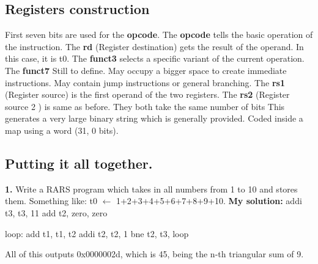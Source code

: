 \documentclass{article}
\begin{document}
    \subsection{Registers construction}
    First seven bits are used for the \textbf{opcode}.\newline
    The \textbf{opcode} tells the basic operation of the instruction.\newline
    The \textbf{rd} (Register destination) gets the result of the operand. 
        In this case, it is t0.\newline
    The \textbf{funct3} selects a specific variant of the current operation.\newline
    The \textbf{funct7} Still to define. May occupy a bigger space to create immediate
    instructions. May contain jump instructions or general branching. \newline
    The \textbf{rs1} (Register source) is the first operand of the two registers.\newline
    The \textbf{rs2} (Register source 2 ) is same as before. They both take the same
        number of bits\newline
    This generates a very large binary string which is generally provided.
    Coded inside a map using a word (31, 0 bits).


    \subsection{Putting it all together.}
    \par \textbf{1.} Write a RARS program which takes in all numbers from 1 to 10 and stores them.
    Something like:  t0 $\leftarrow$ 1+2+3+4+5+6+7+8+9+10. \smallbreak
    \textbf{My solution:} \smallbreak
    addi t3, t3, 11\smallbreak
    add t2, zero, zero\smallbreak

    loop:\smallbreak
        \qquad add t1, t1, t2\smallbreak
        \qquad addi t2, t2, 1\smallbreak
        \qquad bne  t2, t3, loop\smallbreak
    \par All of this outputs 0x0000002d, which is 45, being the n-th triangular
    sum of 9.
\end{document}
